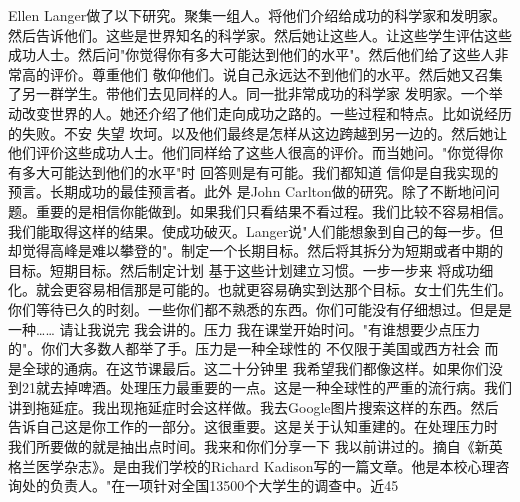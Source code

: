 Ellen Langer做了以下研究。聚集一组人。将他们介绍给成功的科学家和发明家。然后告诉他们。这些是世界知名的科学家。然后她让这些人。让这些学生评估这些成功人士。然后问"你觉得你有多大可能达到他们的水平"。然后他们给了这些人非常高的评价。尊重他们 敬仰他们。说自己永远达不到他们的水平。然后她又召集了另一群学生。带他们去见同样的人。同一批非常成功的科学家 发明家。一个举动改变世界的人。她还介绍了他们走向成功之路的。一些过程和特点。比如说经历的失败。不安 失望 坎坷。以及他们最终是怎样从这边跨越到另一边的。然后她让他们评价这些成功人士。他们同样给了这些人很高的评价。而当她问。"你觉得你有多大可能达到他们的水平"时 回答则是有可能。我们都知道 信仰是自我实现的预言。长期成功的最佳预言者。此外 是John Carlton做的研究。除了不断地问问题。重要的是相信你能做到。如果我们只看结果不看过程。我们比较不容易相信。我们能取得这样的结果。使成功破灭。Langer说"人们能想象到自己的每一步。但却觉得高峰是难以攀登的"。制定一个长期目标。然后将其拆分为短期或者中期的目标。短期目标。然后制定计划 基于这些计划建立习惯。一步一步来 将成功细化。就会更容易相信那是可能的。也就更容易确实到达那个目标。女士们先生们。你们等待已久的时刻。一些你们都不熟悉的东西。你们可能没有仔细想过。但是是一种…… 请让我说完 我会讲的。压力 我在课堂开始时问。"有谁想要少点压力的"。你们大多数人都举了手。压力是一种全球性的 不仅限于美国或西方社会 而是全球的通病。在这节课最后。这二十分钟里 我希望我们都像这样。如果你们没到21就去掉啤酒。处理压力最重要的一点。这是一种全球性的严重的流行病。我们讲到拖延症。我出现拖延症时会这样做。我去Google图片搜索这样的东西。然后告诉自己这是你工作的一部分。这很重要。这是关于认知重建的。在处理压力时 我们所要做的就是抽出点时间。我来和你们分享一下 我以前讲过的。摘自《新英格兰医学杂志》。是由我们学校的Richard Kadison写的一篇文章。他是本校心理咨询处的负责人。"在一项针对全国13500个大学生的调查中。近45%